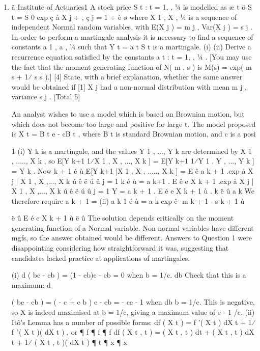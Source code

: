 \documentclass[a4paper,1pt]{article}
\begin{document}
\begin{enumerate}
\item
ã Institute of Actuaries1
A stock price {S t : t = 1, , 1⁄4} is modelled as
æ t
ö
S t = S 0 exp ç å X j ÷ ,
ç j = 1 ÷
è
ø
where X 1 , X  , 1⁄4 is a sequence of independent Normal random variables, with E(X j ) = m j , Var(X j ) = s  j .
In order to perform a martingale analysis it is necessary to find a sequence of constants a 1 , a  , 1⁄4 such that Y t = a t S t is a martingale.
(i)
(ii)
Derive a recurrence equation satisfied by the constants { a t : t = 1, , 1⁄4 }.
[You may use the fact that the moment generating function of N( m , s  ) is
M(s) = exp( m s + 1⁄ s  s  ).]
[4]
State, with a brief explanation, whether the same answer would be obtained if
[1]
X j had a non-normal distribution with mean m j , variance s  j .
[Total 5]

An analyst wishes to use a model which is based on Brownian motion, but which does not become too large and positive for large t. The model proposed is
X t = B t e - cB t ,
where B t is standard Brownian motion, and c is a posi


1
(i)
Y k is a martingale, and the values Y 1 , ..., Y k are determined by X 1 , ....., X k , so
E[Y k+1 1⁄X 1 , X  , ..., X k ] = E[Y k+1 1⁄Y 1 , Y  , ..., Y k ] = Y k .
Now
k + 1
é
ù
E[Y k+1 |X 1 , X  , ....., X k ] = E ê a k + 1 .exp å X j | X 1 , X  ,..., X k ú
ê ë
ú û
j = 1
k
é
ù
= a k+1 . E ê e X k + 1 .exp å X j | X 1 , X  ,..., X k ú
ê ë
ú û
j = 1
Y
= a k + 1 . E é e X k + 1 ù . k
ë
û a
k
We therefore require
a k + 1 =
(ii)
a k
1
é
ù
= a k exp ê -m k + 1 - s  k + 1 ú

ë
û
E é e X k + 1 ù
ë
û
The solution depends critically on the moment generating function of a
Normal variable. Non-normal variables have different mgfs, so the answer
obtained would be different.
Answers to Question 1 were disappointing considering how straightforward it
was, suggesting that candidates lacked practice at applications of
martingales.

(i)
d
( be - cb ) = (1 - cb)e - cb = 0 when b = 1/c.
db
Check that this is a maximum:
d 

( be - cb ) = ( -  c + c  b ) e - cb = - ce - 1 when
db
b = 1/c. This is negative, so X is indeed maximised at b = 1/c, giving a
maximum value of e - 1 /c.
(ii)
Itô's Lemma has a number of possible forms:
df ( X t ) = f '( X t ) dX t + 1⁄ f "( X t )( dX t )  , or
¶ f
¶ f
¶  f
df ( X t , t ) = ( X t , t ) dt + ( X t , t ) dX t + 1⁄  ( X t , t )( dX t ) 
¶ t
¶ x
¶ x


\end{enumerate}
\end{document}
